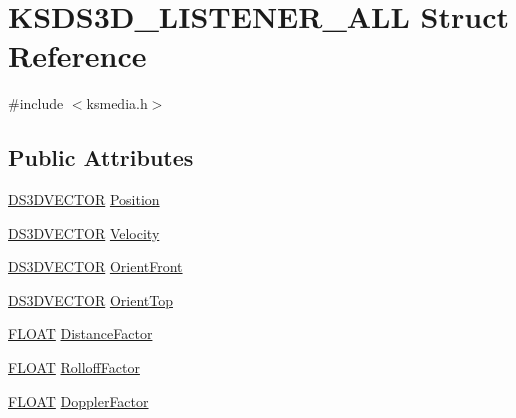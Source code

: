 \hypertarget{struct_k_s_d_s3_d___l_i_s_t_e_n_e_r___a_l_l}{}\section{K\+S\+D\+S3\+D\+\_\+\+L\+I\+S\+T\+E\+N\+E\+R\+\_\+\+A\+LL Struct Reference}
\label{struct_k_s_d_s3_d___l_i_s_t_e_n_e_r___a_l_l}


{\ttfamily \#include $<$ksmedia.\+h$>$}

\subsection*{Public Attributes}
\begin{DoxyCompactItemize}
\item 
\hyperlink{ksmedia_8h_aec2ed92bfacc9df991ae7ef642c4c18e}{D\+S3\+D\+V\+E\+C\+T\+OR} \hyperlink{struct_k_s_d_s3_d___l_i_s_t_e_n_e_r___a_l_l_a0e1563291ea2843e04ac53e27636957a}{Position}
\item 
\hyperlink{ksmedia_8h_aec2ed92bfacc9df991ae7ef642c4c18e}{D\+S3\+D\+V\+E\+C\+T\+OR} \hyperlink{struct_k_s_d_s3_d___l_i_s_t_e_n_e_r___a_l_l_a0bb3930a016c6fdbc3f1790c63afc4f1}{Velocity}
\item 
\hyperlink{ksmedia_8h_aec2ed92bfacc9df991ae7ef642c4c18e}{D\+S3\+D\+V\+E\+C\+T\+OR} \hyperlink{struct_k_s_d_s3_d___l_i_s_t_e_n_e_r___a_l_l_a53a97c04dea1e4225bfd0b61886fa0f8}{Orient\+Front}
\item 
\hyperlink{ksmedia_8h_aec2ed92bfacc9df991ae7ef642c4c18e}{D\+S3\+D\+V\+E\+C\+T\+OR} \hyperlink{struct_k_s_d_s3_d___l_i_s_t_e_n_e_r___a_l_l_a5c1044a150d160ba4c623ceb051acf58}{Orient\+Top}
\item 
\hyperlink{twolame_2libtwolame_2common_8h_ae8690abbffa85934d64d545920e2b108}{F\+L\+O\+AT} \hyperlink{struct_k_s_d_s3_d___l_i_s_t_e_n_e_r___a_l_l_a0b716f232495bf630720c8b86c4785bc}{Distance\+Factor}
\item 
\hyperlink{twolame_2libtwolame_2common_8h_ae8690abbffa85934d64d545920e2b108}{F\+L\+O\+AT} \hyperlink{struct_k_s_d_s3_d___l_i_s_t_e_n_e_r___a_l_l_a484ae9eeba662e8015774dd3810de8a3}{Rolloff\+Factor}
\item 
\hyperlink{twolame_2libtwolame_2common_8h_ae8690abbffa85934d64d545920e2b108}{F\+L\+O\+AT} \hyperlink{struct_k_s_d_s3_d___l_i_s_t_e_n_e_r___a_l_l_ac1de4b3093bd065cbab94281bfd6eab8}{Doppler\+Factor}
\end{DoxyCompactItemize}


